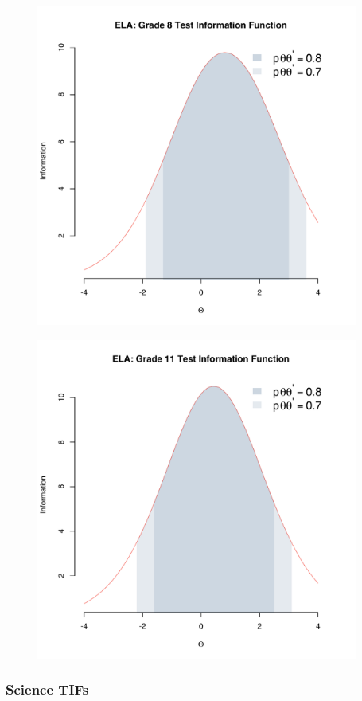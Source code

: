 \documentclass[]{article}
\begin{document}
\begin{figure}
\centering
\includegraphics[height=4.16667in]{tifs/ela8tif.pdf}
\caption{}
\end{figure}

\begin{figure}
\centering
\includegraphics[height=4.16667in]{tifs/ela11tif.pdf}
\caption{}
\end{figure}

\subsubsection{Science TIFs}\label{science-tifs}
\end{document}
